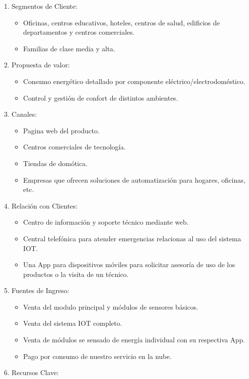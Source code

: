 \documentclass[11pt]{charter}
\begin{document}
\begin{enumerate}
\item Segmentos de Cliente:
\begin{itemize}
\item Oficinas, centros educativos, hoteles, centros de salud, edificios de departamentos y centros comerciales.  
\item Familias de clase media y alta.
\end{itemize}
\item Propuesta de valor:
\begin{itemize}
\item Consumo energético detallado por componente eléctrico/electrodoméstico.
\item Control y gestión de confort de distintos ambientes.
\end{itemize}
\item Canales:
   \begin{itemize}
\item Pagina web del producto.
\item Centros comerciales de tecnología.
\item Tiendas de domótica.
\item Empresas que ofrecen soluciones de automatización para hogares, oficinas, etc.
\end{itemize}
\item Relación con Clientes:
\begin{itemize}
\item Centro de información y soporte técnico mediante web.
\item Central telefónica para atender emergencias relacionas al uso del sistema IOT.
\item Una App para dispositivos móviles para solicitar asesoría de uso de los productos o la visita de un técnico. 
\end{itemize}
\item Fuentes de Ingreso:
\begin{itemize}
\item Venta del modulo principal y módulos de sensores básicos.
\item Venta del sistema IOT completo.
\item Venta de módulos se sensado de energía individual con su respectiva App.
\item Pago por consumo de nuestro servicio en la nube.
\end{itemize}
\item Recursos Clave:
\begin{itemize}

\end{itemize}
\end{enumerate}
\end{document}
